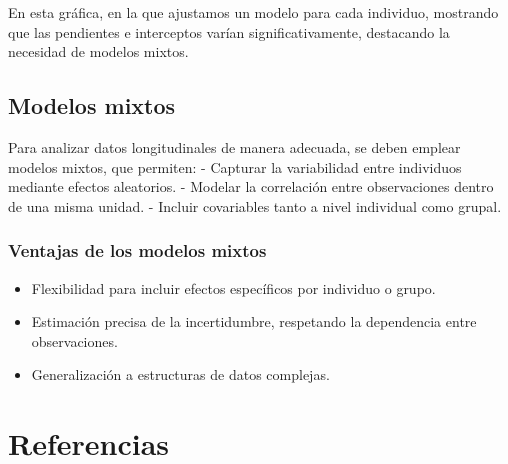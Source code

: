 \documentclass[
  letterpaper,
  DIV=11,
  numbers=noendperiod]{scrreprt}
\providecommand{\tightlist}{%
  \setlength{\itemsep}{0pt}\setlength{\parskip}{0pt}}\usepackage{longtable,booktabs,array}
\newlength{\cslhangindent}
\newenvironment{CSLReferences}[2] %
 {\begin{list}{}{%
  \setlength{\itemindent}{0pt}
  \setlength{\leftmargin}{0pt}
  \setlength{\parsep}{0pt}
  \ifodd #1
   \setlength{\leftmargin}{\cslhangindent}
   \setlength{\itemindent}{-1\cslhangindent}
  \fi
  \setlength{\itemsep}{#2\baselineskip}}}
 {\end{list}}
\begin{document}
En esta gráfica, en la que ajustamos un modelo para cada individuo,
mostrando que las pendientes e interceptos varían significativamente,
destacando la necesidad de modelos mixtos.

\section{Modelos mixtos}\label{modelos-mixtos}

Para analizar datos longitudinales de manera adecuada, se deben emplear
modelos mixtos, que permiten: - Capturar la variabilidad entre
individuos mediante efectos aleatorios. - Modelar la correlación entre
observaciones dentro de una misma unidad. - Incluir covariables tanto a
nivel individual como grupal.

\subsection{Ventajas de los modelos
mixtos}\label{ventajas-de-los-modelos-mixtos}

\begin{itemize}
\tightlist
\item
  Flexibilidad para incluir efectos específicos por individuo o grupo.
\item
  Estimación precisa de la incertidumbre, respetando la dependencia
  entre observaciones.
\item
  Generalización a estructuras de datos complejas.
\end{itemize}


\chapter*{Referencias}\label{referencias}


\label{refs}
\begin{CSLReferences}{0}{1}
\end{CSLReferences}
\end{document}
